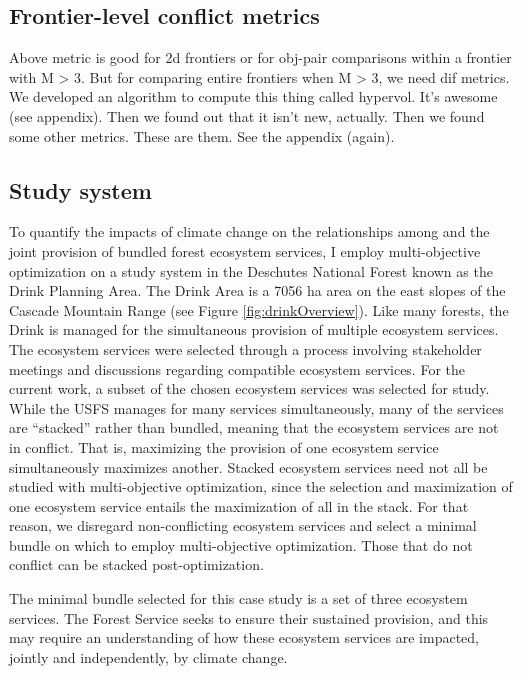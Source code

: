 \subsection{Frontier-level conflict metrics}
Above metric is good for 2d frontiers or for obj-pair comparisons within a frontier with M > 3. But for comparing entire frontiers when M > 3, we need dif metrics. We developed an algorithm to compute this thing called hypervol. It's awesome (see appendix). Then we found out that it isn't new, actually. Then we found some other metrics. These are them. See the appendix (again).

\subsection{Study system}
\label{subsec:studyArea}
To quantify the impacts of climate change on the relationships among and the joint provision of bundled forest ecosystem services, I employ multi-objective optimization on a study system in the Deschutes National Forest known as the Drink Planning Area. The Drink Area is a 7056 ha area on the east slopes of the Cascade Mountain Range (see Figure \ref{fig:drinkOverview}). Like many forests, the Drink is managed for the simultaneous provision of multiple ecosystem services.  The ecosystem services were selected through a process involving stakeholder meetings and discussions regarding compatible ecosystem services. For the current work, a subset of the chosen ecosystem services was selected for study. While the USFS manages for many services simultaneously, many of the services are ``stacked'' rather than bundled, meaning that the ecosystem services are not in conflict. That is, maximizing the provision of one ecosystem service simultaneously maximizes another. Stacked ecosystem services need not all be studied with multi-objective optimization, since the selection and maximization of one ecosystem service entails the maximization of all in the stack. For that reason, we disregard non-conflicting ecosystem services and select a minimal bundle on which to employ multi-objective optimization. Those that do not conflict can be stacked post-optimization.

The minimal bundle selected for this case study is a set of three ecosystem services. The Forest Service seeks to ensure their sustained provision, and this may require an understanding of how these ecosystem services are impacted, jointly and independently, by climate change.

